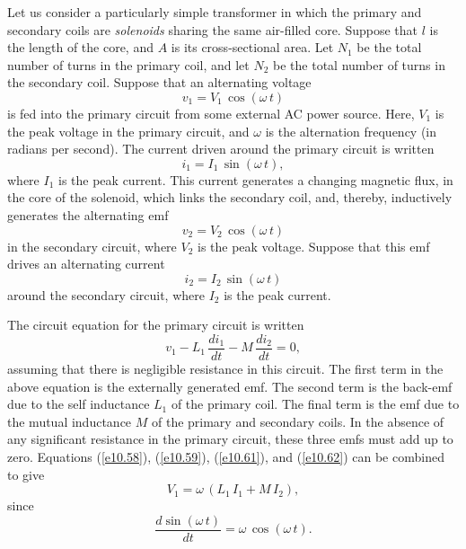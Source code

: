 Let us consider a particularly simple transformer in which the primary and secondary
coils are {\em solenoids}\/ sharing the same air-filled core. Suppose that
$l$ is the length of the core, and $A$ is its cross-sectional area. Let $N_1$ be
the total  number of turns in the primary coil, and let $N_2$ be the 
total number of turns
in the secondary coil. Suppose that an alternating voltage
\begin{equation}\label{e10.58}
v_1 = V_1\,\cos (\omega\, t)
\end{equation}
is fed into the primary circuit from some external AC power source. Here,
$V_1$ is the peak voltage in the primary circuit, and $\omega$ is the
alternation frequency (in radians per second). The current driven around the
primary circuit is written
\begin{equation}\label{e10.59}
i_1 = I_1\,\sin (\omega\, t),
\end{equation}
where $I_1$ is the peak current. This current generates a
changing  magnetic flux, 
in the core of the solenoid, which links the secondary coil, and, thereby, 
inductively generates the alternating emf
\begin{equation}\label{e10.60}
v_2= V_2\,\cos (\omega\, t)
\end{equation}
in the secondary circuit, where $V_2$ is the peak voltage. Suppose that this
emf drives an alternating current
\begin{equation}\label{e10.61}
i_2 = I_2\,\sin (\omega\, t)
\end{equation}
around the secondary circuit, where $I_2$ is the peak current. 

The circuit equation for the primary circuit is written
\begin{equation}\label{e10.62}
v_1 - L_1\,\frac{di_1}{d t} - M\,\frac{di_2}{d t}=0,
\end{equation}
assuming that there is negligible resistance in this circuit. The first term
in the above equation is the externally generated emf. The second term is
the back-emf due to the self inductance $L_1$ of the primary coil. The
final term is the emf due to the mutual inductance $M$ of the primary
and secondary coils. In the absence of any significant resistance in the primary
circuit, these three emfs must add up to zero. Equations (\ref{e10.58}), (\ref{e10.59}),
(\ref{e10.61}), and (\ref{e10.62}) can be combined to give
\begin{equation}\label{e10.63}
V_1 = \omega\,(L_1\,I_1 + M\,I_2),
\end{equation}
since
\begin{equation}\label{e10.64}
\frac{d\sin(\omega\,t)}{dt} = \omega\,\cos(\omega\,t).
\end{equation}

